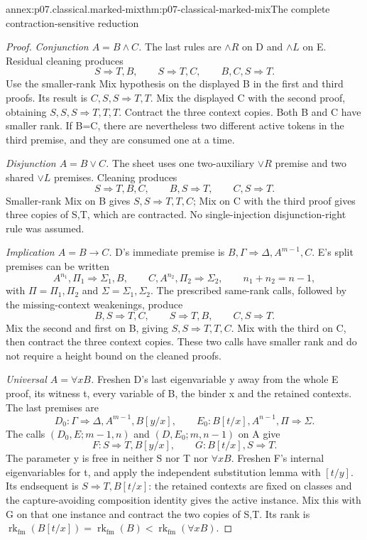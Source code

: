 \begin{annexitem}{annex:p07.classical.marked-mix}{thm:p07-classical-marked-mix}{The complete contraction-sensitive reduction}
\begin{proof}
\emph{Conjunction \(A=B\land C\).}
The last rules are \(\land R\) on D and \(\land L\) on E. Residual
cleaning produces
\[
 S\Rightarrow T,B,\qquad S\Rightarrow T,C,\qquad B,C,S\Rightarrow T.
\]
Use the smaller-rank Mix hypothesis on the displayed B in the first
and third proofs. Its result is \(C,S,S\Rightarrow T,T\).
Mix the displayed C with the second proof, obtaining
\(S,S,S\Rightarrow T,T,T\). Contract the three context copies.
Both B and C have smaller rank. If B=C, there are nevertheless two
different active tokens in the third premise, and they are consumed
one at a time.

\emph{Disjunction \(A=B\lor C\).}
The sheet uses one two-auxiliary \(\lor R\) premise and two shared
\(\lor L\) premises. Cleaning produces
\[
 S\Rightarrow T,B,C,\qquad B,S\Rightarrow T,\qquad C,S\Rightarrow T.
\]
Smaller-rank Mix on B gives \(S,S\Rightarrow T,T,C\); Mix on C with
the third proof gives three copies of S,T, which are contracted. No
single-injection disjunction-right rule was assumed.

\emph{Implication \(A=B\to C\).}
D's immediate premise is
\(B,\Gamma\Rightarrow\Delta,A^{m-1},C\).
E's split premises can be written
\[
 A^{n_1},\Pi_1\Rightarrow\Sigma_1,B,\qquad
 C,A^{n_2},\Pi_2\Rightarrow\Sigma_2,\qquad n_1+n_2=n-1,
\]
with \(\Pi=\Pi_1,\Pi_2\) and \(\Sigma=\Sigma_1,\Sigma_2\).
The prescribed same-rank calls, followed by the missing-context
weakenings, produce
\[
 B,S\Rightarrow T,C,\qquad S\Rightarrow T,B,\qquad C,S\Rightarrow T.
\]
Mix the second and first on B, giving
\(S,S\Rightarrow T,T,C\). Mix with the third on C, then contract
the three context copies. These two calls have smaller rank and do
not require a height bound on the cleaned proofs.

\emph{Universal \(A=\forall xB\).}
Freshen D's last eigenvariable y away from the whole E proof, its
witness t, every variable of B, the binder x and the retained contexts.
The last premises are
\[
 D_0:\Gamma\Rightarrow\Delta,A^{m-1},B[y/x],\qquad
 E_0:B[t/x],A^{n-1},\Pi\Rightarrow\Sigma.
\]
The calls \((D_0,E;m-1,n)\) and \((D,E_0;m,n-1)\) on A give
\[
 F:S\Rightarrow T,B[y/x],\qquad G:B[t/x],S\Rightarrow T.
\]
The parameter y is free in neither S nor T nor \(\forall xB\).
Freshen F's internal eigenvariables for t, and apply the independent
substitution lemma with \([t/y]\). Its endsequent is
\(S\Rightarrow T,B[t/x]\): the retained contexts are fixed on
classes and the capture-avoiding composition identity gives the active
instance. Mix this with G on that one instance and contract the two
copies of S,T. Its rank is
\(\operatorname{rk}_{\mathrm{fm}}(B[t/x])=
\operatorname{rk}_{\mathrm{fm}}(B)<
\operatorname{rk}_{\mathrm{fm}}(\forall xB)\).


\end{proof}
\end{annexitem}
